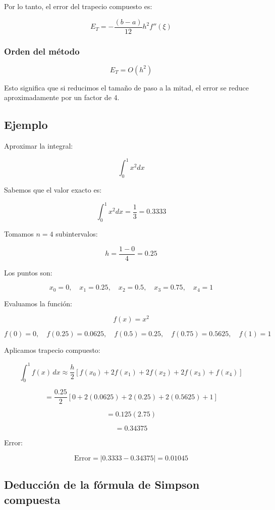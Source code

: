 \documentclass[12pt,a4paper]{article}
\begin{document}
Por lo tanto, el error del trapecio compuesto es:

\[
E_T = -\frac{(b-a)}{12} h^2 f''(\xi)
\]

\subsubsection*{Orden del método}

\[
E_T = O(h^2)
\]

Esto significa que si reducimos el tamaño de paso a la mitad, el error se reduce aproximadamente por un factor de 4.


\subsection{Ejemplo}

Aproximar la integral:

\[
\int_0^1 x^2 dx
\]

Sabemos que el valor exacto es:

\[
\int_0^1 x^2 dx = \frac{1}{3} = 0.3333
\]

Tomamos $n=4$ subintervalos:

\[
h = \frac{1-0}{4} = 0.25
\]

Los puntos son:

\[
x_0 = 0,\quad x_1 = 0.25,\quad x_2 = 0.5,\quad x_3 = 0.75,\quad x_4 = 1
\]

Evaluamos la función:

\[
f(x)=x^2
\]

\[
f(0)=0,\quad f(0.25)=0.0625,\quad f(0.5)=0.25,\quad f(0.75)=0.5625,\quad f(1)=1
\]

Aplicamos trapecio compuesto:

\[
\int_0^1 f(x)\,dx \approx \frac{h}{2}
\left[
f(x_0) + 2f(x_1) + 2f(x_2) + 2f(x_3) + f(x_4)
\right]
\]

\[
= \frac{0.25}{2}
\left[
0 + 2(0.0625) + 2(0.25) + 2(0.5625) + 1
\right]
\]

\[
= 0.125 (2.75)
\]

\[
= 0.34375
\]

Error:

\[
\text{Error} = |0.3333 - 0.34375| = 0.01045
\]



\subsection{Deducción de la fórmula de Simpson compuesta}
\end{document}

